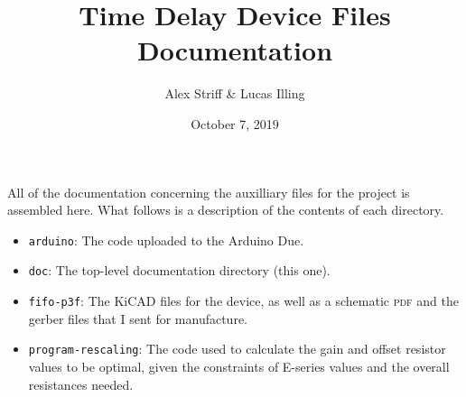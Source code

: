 \documentclass[11pt,letterpaper]{article}
\title{Time Delay Device Files Documentation}
\author{Alex Striff \& Lucas Illing}
\date{October 7, 2019}
\begin{document}
\maketitle

All of the documentation concerning the auxilliary files for the project is
assembled here. What follows is a description of the contents of each directory.

\begin{itemize}
  \item \texttt{arduino}: The code uploaded to the Arduino Due.
  \item \texttt{doc}: The top-level documentation directory (this one).
  \item \texttt{fifo-p3f}: The KiCAD files for the device, as well as a
    schematic \textsc{pdf} and the gerber files that I sent for manufacture.
   \item \texttt{program-rescaling}: The code used to calculate the gain and
    offset resistor values to be optimal, given the constraints of E-series
    values and the overall resistances needed.
\end{itemize}
\end{document}
